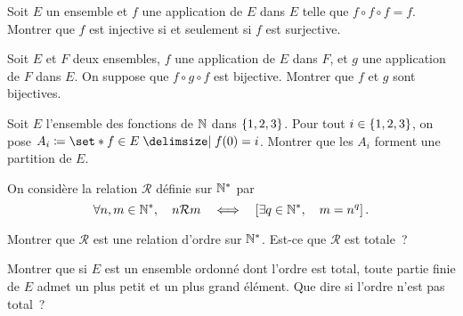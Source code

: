 \documentclass{magnolia}
\begin{document}

Soit $E$ un ensemble et $f$ une application de $E$ dans $E$ telle que $f\circ f\circ f=f$. Montrer que $f$ est injective si et seulement si $f$ est surjective.

Soit $E$ et $F$ deux ensembles, $f$ une application de $E$ dans $F$, et $g$ une application de $F$ dans $E$. On suppose que $f\circ g\circ f$ est bijective. Montrer que $f$ et $g$ sont bijectives.


Soit $E$ l'ensemble des fonctions de $\mathbb{N}$ dans $\left\{1,2,3\right\}$. Pour tout
$i\in\left\{1,2,3\right\}$, on pose $A_i\defeq\enstq{f\in E}{f(0)=i}$. Montrer que les $A_i$
forment une partition de $E$.



On considère la relation $\mathcal{R}$ définie sur ${\mathbb{N}^*}$ par
\[\forall n,m\in{\mathbb{N}^*},\quad n\mathcal{R}m \quad\Longleftrightarrow\quad \left[\exists q\in{\mathbb{N}^*} ,\quad m=n^q\right].\]
\begin{questions}
\question Montrer que $\mathcal{R}$ est une relation d'ordre sur ${\mathbb{N}^*}$.
\question Est-ce que $\mathcal{R}$ est totale~?
\end{questions}

Montrer que si $E$ est un ensemble ordonné dont l'ordre est total, toute partie
finie de $E$ admet un plus petit et un plus grand élément. Que dire si l'ordre
n'est pas total~?
\end{document}
